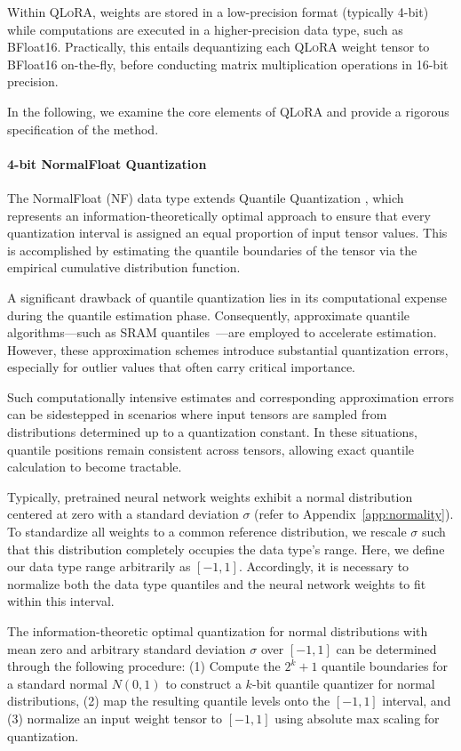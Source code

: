 Within \textsc{QLoRA}, weights are stored in a low-precision format (typically 4-bit) while computations are executed in a higher-precision data type, such as BFloat16. Practically, this entails dequantizing each \textsc{QLoRA} weight tensor to BFloat16 on-the-fly, before conducting matrix multiplication operations in 16-bit precision.

In the following, we examine the core elements of \textsc{QLoRA} and provide a rigorous specification of the method.

\paragraph{4-bit NormalFloat Quantization} The NormalFloat (NF) data type extends Quantile Quantization \citep{dettmers2022optimizers}, which represents an information-theoretically optimal approach to ensure that every quantization interval is assigned an equal proportion of input tensor values. This is accomplished by estimating the quantile boundaries of the tensor via the empirical cumulative distribution function.

A significant drawback of quantile quantization lies in its computational expense during the quantile estimation phase. Consequently, approximate quantile algorithms—such as SRAM quantiles~\citep{dettmers2022optimizers}—are employed to accelerate estimation. However, these approximation schemes introduce substantial quantization errors, especially for outlier values that often carry critical importance.

Such computationally intensive estimates and corresponding approximation errors can be sidestepped in scenarios where input tensors are sampled from distributions determined up to a quantization constant. In these situations, quantile positions remain consistent across tensors, allowing exact quantile calculation to become tractable.

Typically, pretrained neural network weights exhibit a normal distribution centered at zero with a standard deviation $\sigma$ (refer to Appendix~\ref{app:normality}). To standardize all weights to a common reference distribution, we rescale $\sigma$ such that this distribution completely occupies the data type’s range. Here, we define our data type range arbitrarily as $[-1, 1]$. Accordingly, it is necessary to normalize both the data type quantiles and the neural network weights to fit within this interval.

The information-theoretic optimal quantization for normal distributions with mean zero and arbitrary standard deviation $\sigma$ over $[-1, 1]$ can be determined through the following procedure: (1) Compute the $2^k+1$ quantile boundaries for a standard normal $N(0, 1)$ to construct a $k$-bit quantile quantizer for normal distributions, (2) map the resulting quantile levels onto the $[-1, 1]$ interval, and (3) normalize an input weight tensor to $[-1, 1]$ using absolute max scaling for quantization. 

